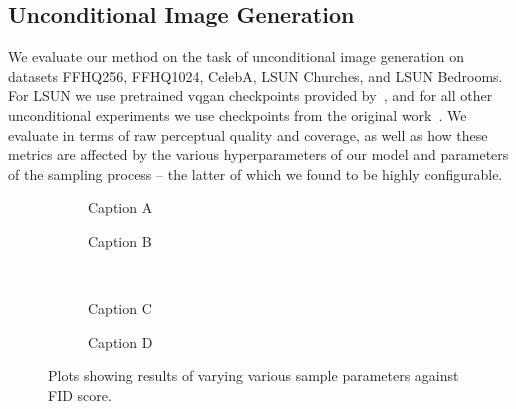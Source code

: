 
\subsection{Unconditional Image Generation}

We evaluate our method on the task of unconditional image generation on datasets
FFHQ256, FFHQ1024, CelebA, LSUN Churches, and LSUN Bedrooms. For LSUN we use
pretrained \gls{vqgan} checkpoints provided by~\cite{bondtaylor2021unleashing},
and for all other unconditional experiments we use checkpoints from the original
work~\cite{esser2021taming}. We evaluate in terms of raw perceptual quality and
coverage, as well as how these metrics are affected by the various
hyperparameters of our model and parameters of the sampling process -- the
latter of which we found to be highly configurable.

\begin{figure}
    \centering
    \begin{subfigure}[b]{0.49\textwidth}
        \centering
        \resizebox{\textwidth}{!}{
            
        }
        \caption{Caption A}
    \end{subfigure}
    \hfill
    \begin{subfigure}[b]{0.49\textwidth}
        \centering
        \resizebox{\textwidth}{!}{
            
        }
        \caption{Caption B}
    \end{subfigure}
    \\
    \begin{subfigure}[b]{0.49\textwidth}
        \centering
        \resizebox{\textwidth}{!}{
            
        }
        \caption{Caption C}
    \end{subfigure}
    \hfill
    \begin{subfigure}[b]{0.49\textwidth}
        \centering
        \resizebox{\textwidth}{!}{
            
        }
        \caption{Caption D}
    \end{subfigure}
\caption{Plots showing results of varying various sample parameters against FID
score.}
\end{figure}

